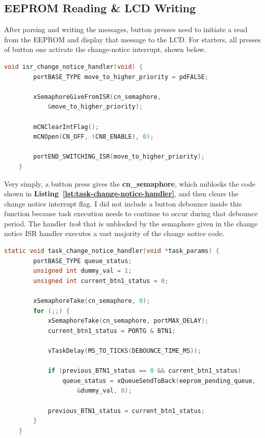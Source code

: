\documentclass[a4paper, 12pt]{article}
\begin{document}
\subsection{EEPROM Reading \& LCD Writing}
After parsing and writing the messages, button presses need to initiate a read from the EEPROM and display that message to the LCD. For starters, all presses of button one activate the change-notice interrupt, shown below.

	\begin{mdframed}[backgroundcolor=code-gray, roundcorner=10pt,
								innerleftmargin=5, innertopmargin=5, innerbottommargin=5]	
	\begin{lstlisting}[language=C, caption=Change Notice ISR Handler, tabsize=2, label={lst:isr-change-notice-handler}]
	void isr_change_notice_handler(void) {
		portBASE_TYPE move_to_higher_priority = pdFALSE;
	
		xSemaphoreGiveFromISR(cn_semaphore,
			&move_to_higher_priority);
	
		mCNClearIntFlag();
		mCNOpen(CN_OFF, (CN8_ENABLE), 0);
	
		portEND_SWITCHING_ISR(move_to_higher_priority);
	}
	\end{lstlisting}
	\end{mdframed}
	
Very simply, a button press gives the \textbf{cn\_semaphore}, which unblocks the code shown in \textbf{Listing~\ref{lst:task-change-notice-handler}}, and then clears the change notice interrupt flag. I did not include a button debounce inside this function because task execution needs to continue to occur during that debounce period. The handler \emph{task} that is unblocked by the semaphore given in the change notice ISR handler executes a vast majority of the change notice code.

	\begin{mdframed}[backgroundcolor=code-gray, roundcorner=10pt,
								innerleftmargin=5, innertopmargin=5, innerbottommargin=5]	
	\begin{lstlisting}[language=C, caption=Change Notice Handler Task, tabsize=2, label={lst:task-change-notice-handler}]
	static void task_change_notice_handler(void *task_params) {
		portBASE_TYPE queue_status;
		unsigned int dummy_val = 1;
		unsigned int current_btn1_status = 0;
	
		xSemaphoreTake(cn_semaphore, 0);
		for (;;) {
			xSemaphoreTake(cn_semaphore, portMAX_DELAY);
			current_btn1_status = PORTG & BTN1;
			
			vTaskDelay(MS_TO_TICKS(DEBOUNCE_TIME_MS));
		
			if (previous_BTN1_status == 0 && current_btn1_status)
				queue_status = xQueueSendToBack(eeprom_pending_queue,
					&dummy_val, 0);
		
			previous_BTN1_status = current_btn1_status;
		}
	}
	\end{lstlisting}
	\end{mdframed}
	
\end{document}
